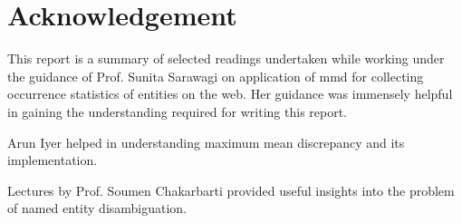 \section{Acknowledgement}
This report is a summary of selected readings undertaken while working under the guidance 
of Prof. Sunita Sarawagi on application of mmd for collecting occurrence statistics 
of entities on the web. Her guidance was immensely helpful in gaining the understanding 
required for writing this report.

Arun Iyer helped in understanding maximum mean discrepancy and its implementation.

Lectures by Prof. Soumen Chakarbarti provided useful insights into the problem of named entity disambiguation.

